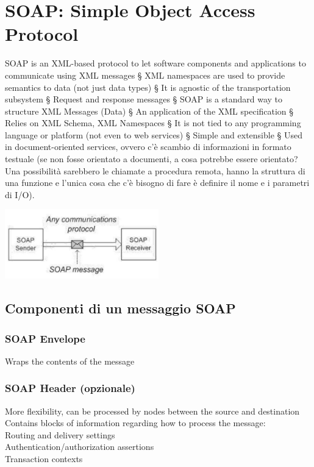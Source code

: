 \section{SOAP: Simple Object Access Protocol}
SOAP is an XML-based protocol to let software components and applications to communicate using XML
messages
§ XML namespaces are used to provide semantics to data (not just data types)
§ It is agnostic of the transportation subsystem
§ Request and response messages
§ SOAP is a standard way to structure XML Messages (Data)
§ An application of the XML specification
§ Relies on XML Schema, XML Namespaces
§ It is not tied to any programming language or platform (not even to web services)
§ Simple and extensible
§ Used in document-oriented services, ovvero c'è scambio di informazioni in formato testuale (se non fosse orientato a documenti, a cosa potrebbe essere orientato? Una possibilità sarebbero le chiamate a procedura remota, hanno la struttura di una funzione e l'unica cosa che c'è bisogno di fare è definire il nome e i parametri di I/O).
\begin{center}
    \includegraphics[width=0.5\textwidth]{img/SoapServices2.jpg}
\end{center}

\subsection{Componenti di un messaggio SOAP}
\subsubsection{SOAP Envelope}
Wraps the contents of the message
\subsubsection{SOAP Header (opzionale)}
More flexibility, can be processed by nodes between the source and destination
\\Contains blocks of information regarding how to process the message:
\\Routing and delivery settings
\\Authentication/authorization assertions
\\Transaction contexts
